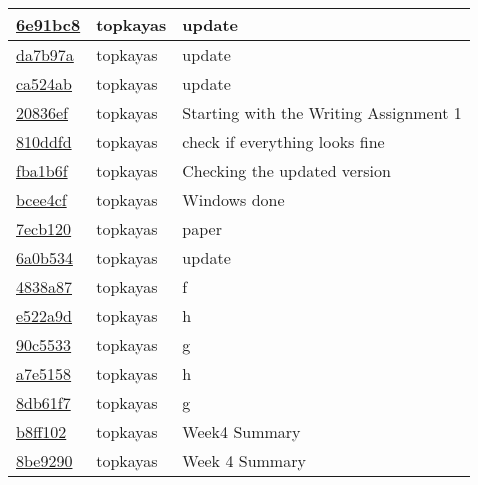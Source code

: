 \begin{tabular}{l l l}
\href{git@github.com:topkayas/CS444/commit/6e91bc83dea6dbe8f7916dccd0ed4969bbcdf2c4}{6e91bc8} & topkayas & update\\\hline
\href{git@github.com:topkayas/CS444/commit/da7b97ae1b38f767f211432d63b1cb1535208377}{da7b97a} & topkayas & update\\\hline
\href{git@github.com:topkayas/CS444/commit/ca524ab7c929dc1e7d0e977ce1d2e19452e40718}{ca524ab} & topkayas & update\\\hline
\href{git@github.com:topkayas/CS444/commit/20836ef8a96f97bfcfe0d8a01f4e0aeaaeb7438b}{20836ef} & topkayas & Starting with the Writing Assignment 1\\\hline
\href{git@github.com:topkayas/CS444/commit/810ddfde1cd5aff5b3973e41f92779faff0bde06}{810ddfd} & topkayas & check if everything looks fine\\\hline
\href{git@github.com:topkayas/CS444/commit/fba1b6f752edb17e9a05c9e74bc2b4df7f14f1c8}{fba1b6f} & topkayas & Checking the updated version\\\hline
\href{git@github.com:topkayas/CS444/commit/bcee4cf40b3a2945e795c81d45184fbc51806cd7}{bcee4cf} & topkayas & Windows done\\\hline
\href{git@github.com:topkayas/CS444/commit/7ecb120b31b8d85b1c441e9fcc72113e5bc0dcc5}{7ecb120} & topkayas & paper\\\hline
\href{git@github.com:topkayas/CS444/commit/6a0b5342ec1ed581ddbe751da36483ff4a391cb1}{6a0b534} & topkayas & update\\\hline
\href{git@github.com:topkayas/CS444/commit/4838a87c6da32de64b3434de11996b7fb3c2ded6}{4838a87} & topkayas & f\\\hline
\href{git@github.com:topkayas/CS444/commit/e522a9db42f957b862b5a4a6883dc96ebe12a5af}{e522a9d} & topkayas & h\\\hline
\href{git@github.com:topkayas/CS444/commit/90c55337881a81dc960a6e5cce07e2aadc7dca57}{90c5533} & topkayas & g\\\hline
\href{git@github.com:topkayas/CS444/commit/a7e5158a71a2e21d8965232d7f966d84c58b4925}{a7e5158} & topkayas & h\\\hline
\href{git@github.com:topkayas/CS444/commit/8db61f790d72db60a0079bdea7ea90b2c7db6872}{8db61f7} & topkayas & g\\\hline
\href{git@github.com:topkayas/CS444/commit/b8ff1022d12b6742cebcb54378369ff782dac89f}{b8ff102} & topkayas & Week4 Summary\\\hline
\href{git@github.com:topkayas/CS444/commit/8be92908e659605ebe7f457758fb51036d05dbef}{8be9290} & topkayas & Week 4 Summary\\\hline

\end{tabular}

